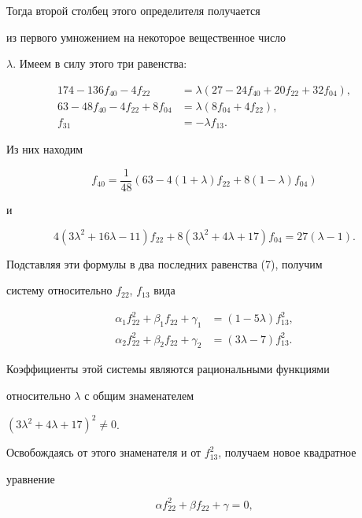 Тогда второй столбец этого определителя получается 


из первого умножением на некоторое вещественное число


$\lambda$. Имеем в силу этого три равенства:


\begin{align*}


174 - 136 f_{40} - 4 f_{22}&=\lambda (27 - 24 f_{40}+20 f_{22}+


32 f_{04}), \\


63 - 48 f_{40} - 4 f_{22}+8 f_{04}&=\lambda (8 f_{04}+4 f_{22}), \\


f_{31}&=- \lambda f_{13}.


\end{align*}


Из них находим


$$


f_{40}=\frac1{48} (63 - 4(1+\lambda) f_{22}+8 (1 - \lambda) f_{04})


$$


и


$$


4 (3 \lambda^2+16 \lambda - 11) f_{22}+


8 (3 \lambda^2+4 \lambda+17) f_{04}=27 (\lambda -1).


$$


Подставляя эти формулы в два последних равенства (7), получим


систему относительно $f_{22}$, $f_{13}$ вида


\begin{align*}


\alpha_1 f^2_{22}+\beta_1 f_{22}+\gamma_1&=(1 - 5\lambda) f^2_{13}, \\


\alpha_2 f^2_{22}+\beta_2 f_{22}+\gamma_2&=(3 \lambda - 7) f^2_{13}.


\end{align*}


Коэффициенты этой системы являются рациональными функциями


относительно $\lambda$ с общим знаменателем


$(3 \lambda^2+4 \lambda+17)^2 \ne 0$.


Освобождаясь от этого знаменателя и от $f_{13}^2$, получаем новое квадратное


уравнение


\begin{equation}


\alpha f^2_{22}+\beta f_{22}+\gamma=0,


\end{equation}


